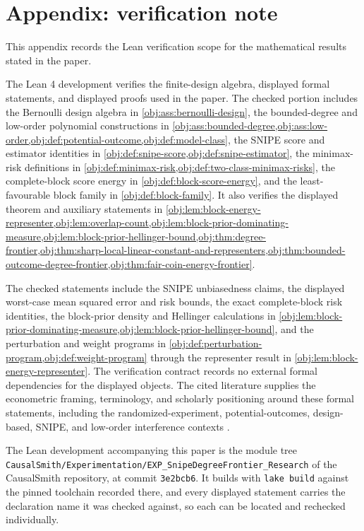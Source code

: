 \section{Appendix: verification note}

This appendix records the Lean verification scope for the mathematical results stated in the paper.

The Lean 4 development verifies the finite-design algebra, displayed formal statements, and displayed proofs used in the paper. The checked portion includes the Bernoulli design algebra in \cref{obj:ass:bernoulli-design}, the bounded-degree and low-order polynomial constructions in \cref{obj:ass:bounded-degree,obj:ass:low-order,obj:def:potential-outcome,obj:def:model-class}, the SNIPE score and estimator identities in \cref{obj:def:snipe-score,obj:def:snipe-estimator}, the minimax-risk definitions in \cref{obj:def:minimax-risk,obj:def:two-class-minimax-risks}, the complete-block score energy in \cref{obj:def:block-score-energy}, and the least-favourable block family in \cref{obj:def:block-family}. It also verifies the displayed theorem and auxiliary statements in \cref{obj:lem:block-energy-representer,obj:lem:overlap-count,obj:lem:block-prior-dominating-measure,obj:lem:block-prior-hellinger-bound,obj:thm:degree-frontier,obj:thm:sharp-local-linear-constant-and-representers,obj:thm:bounded-outcome-degree-frontier,obj:thm:fair-coin-energy-frontier}.

The checked statements include the SNIPE unbiasedness claims, the displayed worst-case mean squared error and risk bounds, the exact complete-block risk identities, the block-prior density and Hellinger calculations in \cref{obj:lem:block-prior-dominating-measure,obj:lem:block-prior-hellinger-bound}, and the perturbation and weight programs in \cref{obj:def:perturbation-program,obj:def:weight-program} through the representer result in \cref{obj:lem:block-energy-representer}. The verification contract records no external formal dependencies for the displayed objects. The cited literature supplies the econometric framing, terminology, and scholarly positioning around these formal statements, including the randomized-experiment, potential-outcomes, design-based, SNIPE, and low-order interference contexts \citep{HorvitzThompson1952,Rubin1978,ImbensRubin2015,Aronow2017,CortezRodriguezEichhornYu2023,HarshawSavjeWang2025}.

The Lean development accompanying this paper is the module tree \texttt{CausalSmith/Experimentation/EXP\_SnipeDegreeFrontier\_Research} of the CausalSmith repository, at commit \texttt{3e2bcb6}. It builds with \texttt{lake build} against the pinned toolchain recorded there, and every displayed statement carries the declaration name it was checked against, so each can be located and rechecked individually.
